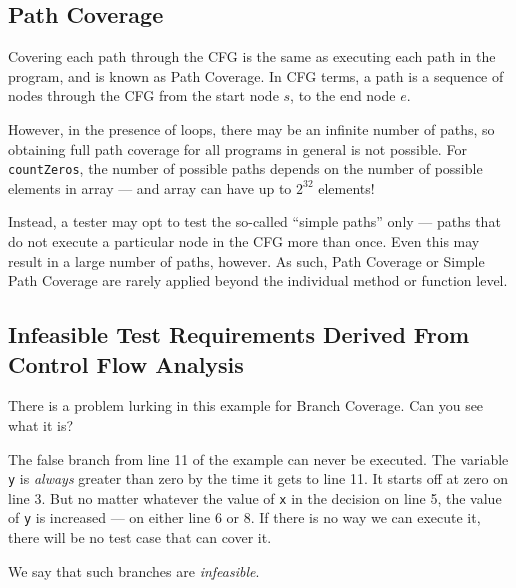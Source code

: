 \subsection{Path Coverage} 

Covering each path through the CFG is the same as executing each path in the
program, and is known as Path Coverage. In CFG terms, a path is a sequence of
nodes through the CFG from the start node $s$, to the end node $e$. 


However, in the presence of loops, there may be an infinite number of paths, so
obtaining full path coverage for all programs in general is not possible. For
{\tt countZeros}, the number of possible paths depends on the number of possible
elements in array --- and array can have up to $2^{32}$ elements!

Instead, a tester may opt to test the so-called ``simple paths'' only --- paths
that do not execute a particular node in the CFG more than once. Even this may
result in a large number of paths, however. As such, Path Coverage or Simple
Path Coverage are rarely applied beyond the individual method or function level.


\subsection{Infeasible Test Requirements Derived From Control Flow Analysis} 

There is a problem lurking in this example for Branch Coverage. Can you see what
it is?




The false branch from line 11 of the example can never be executed. The variable
{\tt y} is {\it always} greater than zero by the time it gets to line 11. It
starts off at zero on line 3. But no matter whatever the value of {\tt x} in the
decision on line 5, the value of {\tt y} is increased --- on either line 6 or 8.
If there is no way we can execute it, there will be no test case that can cover
it.

We say that such branches are {\it infeasible}. 



